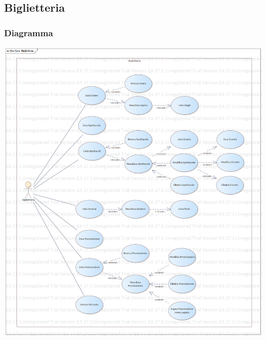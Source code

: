 \documentclass{article}
\begin{document}


        \subsection{Biglietteria}
            \subsubsection{Diagramma}
                \includegraphics[width=\textwidth]{imgs/use_case/biglietteria}
            
\end{document}
